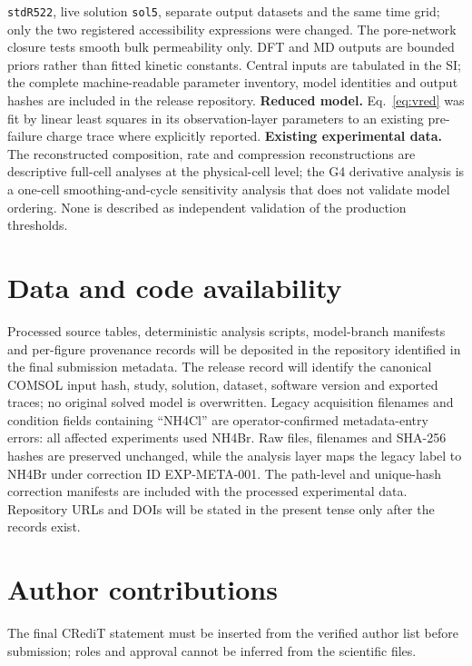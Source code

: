 \documentclass[11pt]{article}
\begin{document}
\texttt{stdR522}, live solution \texttt{sol5}, separate output datasets and the same time grid; only the two
registered accessibility expressions were changed. The pore-network closure tests smooth bulk permeability
only. DFT and MD outputs are bounded priors rather than fitted kinetic constants. Central inputs are tabulated
in the SI; the complete machine-readable parameter inventory, model identities and output hashes are included
in the release repository. \textbf{Reduced model.} Eq.~\eqref{eq:vred} was
fit by linear least squares in its observation-layer parameters to an existing pre-failure charge trace where
explicitly reported. \textbf{Existing experimental data.} The reconstructed composition, rate and compression
reconstructions are descriptive full-cell analyses at the physical-cell level; the G4 derivative analysis is a
one-cell smoothing-and-cycle sensitivity analysis that does not validate model ordering. None is described as
independent validation of the production thresholds.

\section*{Data and code availability}
Processed source tables, deterministic analysis scripts, model-branch manifests and per-figure provenance
records will be deposited in the repository identified in the final submission metadata. The release record
will identify the canonical COMSOL input hash, study, solution, dataset, software version and exported traces;
no original solved model is overwritten. Legacy acquisition filenames and condition fields containing
``NH4Cl'' are operator-confirmed metadata-entry errors: all affected experiments used NH4Br. Raw files,
filenames and SHA-256 hashes are preserved unchanged, while the analysis layer maps the legacy label to NH4Br
under correction ID EXP-META-001. The path-level and unique-hash correction manifests are included with the
processed experimental data. Repository URLs and DOIs will be stated in the present tense only after the
records exist.

\section*{Author contributions}
The final CRediT statement must be inserted from the verified author list before submission; roles and approval
cannot be inferred from the scientific files.
\end{document}
